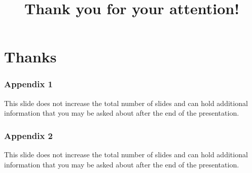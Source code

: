 \documentclass[11pt,t,usepdftitle=false,aspectratio=169]{beamer}
\begin{document}
\title{Thank you for your attention!}
\subtitle{}
\section{Thanks}


\appendix

\begin{frame}
\frametitle{Appendix 1}
    This slide does not increase the total number of slides and can hold additional information
    that you may be asked about after the end of the presentation.
\end{frame}

\begin{frame}
\frametitle{Appendix 2}
    This slide does not increase the total number of slides and can hold additional information
    that you may be asked about after the end of the presentation.
\end{frame}
\end{document}

